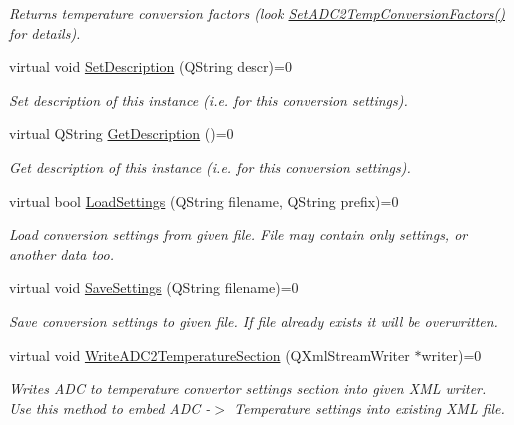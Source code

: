\begin{DoxyCompactItemize}
\begin{DoxyCompactList}\small\item\em Returns temperature conversion factors (look \hyperlink{class_interfaces_1_1_i_adc_temperature_convertor_a3e4c9204b3593bc434a041c7a69c430f}{Set\+A\+D\+C2\+Temp\+Conversion\+Factors()} for details). \end{DoxyCompactList}\item 
virtual void \hyperlink{class_interfaces_1_1_i_adc_temperature_convertor_a65bbef2300e21c495d95305921ddb74b}{Set\+Description} (Q\+String descr)=0
\begin{DoxyCompactList}\small\item\em Set description of this instance (i.\+e. for this conversion settings). \end{DoxyCompactList}\item 
virtual Q\+String \hyperlink{class_interfaces_1_1_i_adc_temperature_convertor_a2f3b59be793c3ed43e880ef12e9749bc}{Get\+Description} ()=0
\begin{DoxyCompactList}\small\item\em Get description of this instance (i.\+e. for this conversion settings). \end{DoxyCompactList}\item 
virtual bool \hyperlink{class_interfaces_1_1_i_adc_temperature_convertor_a3b1d84ea243b62a36238f16433668a23}{Load\+Settings} (Q\+String filename, Q\+String prefix)=0
\begin{DoxyCompactList}\small\item\em Load conversion settings from given file. File may contain only settings, or another data too. \end{DoxyCompactList}\item 
virtual void \hyperlink{class_interfaces_1_1_i_adc_temperature_convertor_a6631e979e067ab78d3e5c337449876ac}{Save\+Settings} (Q\+String filename)=0
\begin{DoxyCompactList}\small\item\em Save conversion settings to given file. If file already exists it will be overwritten. \end{DoxyCompactList}\item 
virtual void \hyperlink{class_interfaces_1_1_i_adc_temperature_convertor_abc7ed5fdfeaed255af14930431b46ac1}{Write\+A\+D\+C2\+Temperature\+Section} (Q\+Xml\+Stream\+Writer $\ast$writer)=0
\begin{DoxyCompactList}\small\item\em Writes A\+DC to temperature convertor settings section into given X\+ML writer. Use this method to embed A\+DC -\/$>$ Temperature settings into existing X\+ML file. \end{DoxyCompactList}\end{DoxyCompactItemize}



